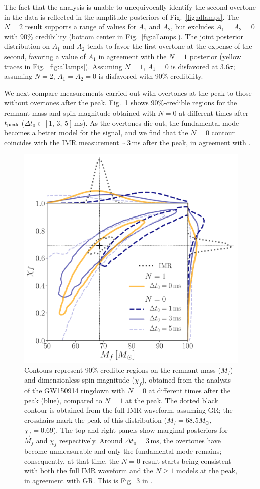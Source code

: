 \documentclass[letterpaper]{article}
\newcommand*{\fig}[1]{Fig.~\ref{fig:#1}}
\newcommand{\mf}{M_f}
\newcommand{\chif}{\chi_f}
\newcommand{\tpeak}{t_{\rm peak}}
\begin{document}
The fact that the analysis is unable to unequivocally identify the second overtone in the data is reflected in the amplitude posteriors of \fig{allamps}.
The $N=2$ result supports a range of values for $A_1$ and $A_2$, but excludes $A_1=A_2=0$ with 90\% credibility (bottom center in \fig{allamps}).
The joint posterior distribution on $A_1$ and $A_2$ tends to favor the first overtone at the expense of the second, favoring a value of $A_1$ in agreement with the $N=1$ posterior (yellow traces in \fig{allamps}).
Assuming $N=1$, $A_1=0$ is disfavored at {$3.6\sigma$}; assuming $N=2$, $A_1=A_2=0$ is disfavored with 90\% credibility.

We next compare measurements carried out with overtones at the peak to those without overtones after the peak.
\fig{contours_t0} shows 90\%-credible regions for the remnant mass and spin magnitude obtained with $N=0$ at different times after $\tpeak$ ({$\Delta t_0 \in [1,\,3,\,5]\,\mathrm{ms}$}).
As the overtones die out, the fundamental mode becomes a better model for the signal, and we find that the $N=0$ contour coincides with the IMR measurement ${\sim}3\,$ms after the peak, in agreement with \cite{gw150914_tgr}.

\begin{figure}[bt]
\centering
\includegraphics[width=0.66\columnwidth,clip=true]{contours_gw150914_t0}
\caption{
    Contours represent 90\%-credible regions on the remnant mass ($\mf$) and dimensionless spin magnitude ($\chi_f$), obtained from the analysis of the  GW150914 ringdown with $N=0$ at different times after the peak (blue), compared to $N=1$ at the peak.
    The dotted black contour is obtained from the full IMR waveform, assuming GR; the crosshairs mark the peak of this distribution ($\mf = 68.5 M_\odot$, $\chi_f=0.69$).
    The top and right panels show marginal posteriors for $\mf$ and $\chif$ respectively.
    Around $\Delta t_0 = 3\, \mathrm{ms}$, the overtones have become unmeasurable and only the fundamental mode remains; consequently, at that time, the $N=0$ result starts being consistent with both the full IMR waveform and the $N\geq 1$ models at the peak, in agreement with GR.
    This is Fig.~3 in \cite{Isi:2019aib}.
}
\label{fig:contours_t0}
\end{figure}
\end{document}
